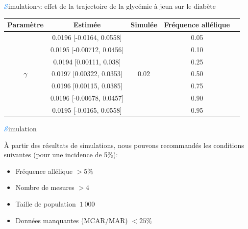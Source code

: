 \begin{frame}{{\huge\textcolor{dodgerblue}{$\mathcal{S}$}}imulation}{$\gamma$: effet de la trajectoire de la glycémie à jeun sur le diabète}
    {\small \begin{center}
        \begin{tabular}{ccccc}
            \hline
            Paramètre & Estimée & Simulée & Fréquence allélique\\
            \hline
            \multirow{7}{*}{$\gamma$} & \textcolor{maroon2}{0.0196 [-0.0164, 0.0558]} & \multirow{7}{*}{0.02} & 0.05 \\
             & \textcolor{maroon2}{0.0195 [-0.00712, 0.0456]} &  & 0.10 \\
             & 0.0194 [0.00111, 0.038] &  & 0.25 \\
             & 0.0197 [0.00322, 0.0353] &  & 0.50 \\
             & 0.0196 [0.00115, 0.0385] &  & 0.75 \\
             & \textcolor{maroon2}{0.0196 [-0.00678, 0.0457]} &  & 0.90 \\
             & \textcolor{maroon2}{0.0195 [-0.0165, 0.0558]} &  & 0.95 \\
            \hline
        \end{tabular}
    \end{center}}
\end{frame}

\begin{frame}{{\huge\textcolor{dodgerblue}{$\mathcal{S}$}}imulation}
\par{\`A partir des résultats de simulations, nous pouvons recommandés les conditions suivantes (pour une incidence de 5\%):
\vspace{1em}
\begin{itemize}
    \item Fréquence allélique $>5\%$
    \vspace{0.5em}
    \item Nombre de mesures $>4$
    \vspace{0.5em}
    \item Taille de population $\>1~000$
    \vspace{0.5em}
    \item Données manquantes (MCAR/MAR) $<25\%$
\end{itemize}
}
\end{frame}


